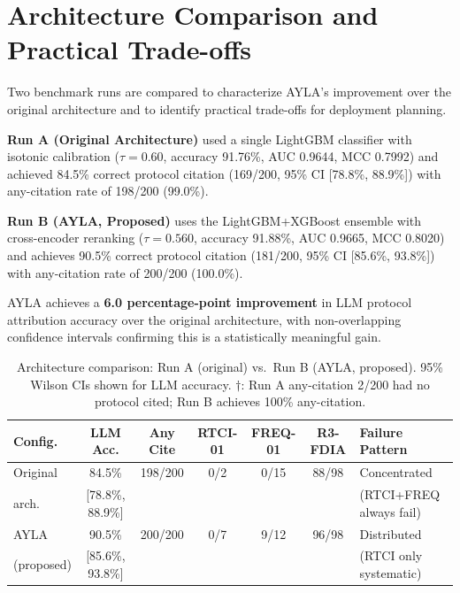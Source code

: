 \documentclass[twocolumn, 10pt, letterpaper]{article}
\begin{document}
\section{Architecture Comparison and Practical Trade-offs}
\label{sec:comparison}

Two benchmark runs are compared to characterize AYLA's improvement over the
original architecture and to identify practical trade-offs for deployment planning.

\textbf{Run A (Original Architecture)} used a single LightGBM classifier with
isotonic calibration ($\tau{=}0.60$, accuracy 91.76\%, AUC 0.9644, MCC 0.7992)
and achieved 84.5\% correct protocol citation (169/200, 95\% CI [78.8\%, 88.9\%])
with any-citation rate of 198/200 (99.0\%).

\textbf{Run B (AYLA, Proposed)} uses the LightGBM+XGBoost ensemble with
cross-encoder reranking ($\tau{=}0.560$, accuracy 91.88\%, AUC 0.9665,
MCC 0.8020) and achieves 90.5\% correct protocol citation (181/200,
95\% CI [85.6\%, 93.8\%]) with any-citation rate of 200/200 (100.0\%).

AYLA achieves a \textbf{6.0 percentage-point improvement} in LLM protocol
attribution accuracy over the original architecture, with non-overlapping
confidence intervals confirming this is a statistically meaningful gain.

\begin{table}[t]
\centering
\caption{Architecture comparison: Run A (original) vs.\ Run B (AYLA, proposed).
         95\% Wilson CIs shown for LLM accuracy. $\dagger$: Run A any-citation
         2/200 had no protocol cited; Run B achieves 100\% any-citation.}
\label{tab:arch_compare}
\small
\begin{tabular}{lcccccp{3.2cm}}
\toprule
\textbf{Config.} & \textbf{LLM Acc.} & \textbf{Any Cite} & \textbf{RTCI-01} & \textbf{FREQ-01} & \textbf{R3-FDIA} & \textbf{Failure Pattern} \\
\midrule
Original & 84.5\% & 198/200 & 0/2 & 0/15 & 88/98 & Concentrated \\
arch.    & [78.8\%, 88.9\%] & & & & & (RTCI+FREQ always fail) \\[4pt]
AYLA & 90.5\% & 200/200 & 0/7 & 9/12 & 96/98 & Distributed \\
(proposed) & [85.6\%, 93.8\%] & & & & & (RTCI only systematic) \\
\bottomrule
\end{tabular}
\end{table}
\end{document}
